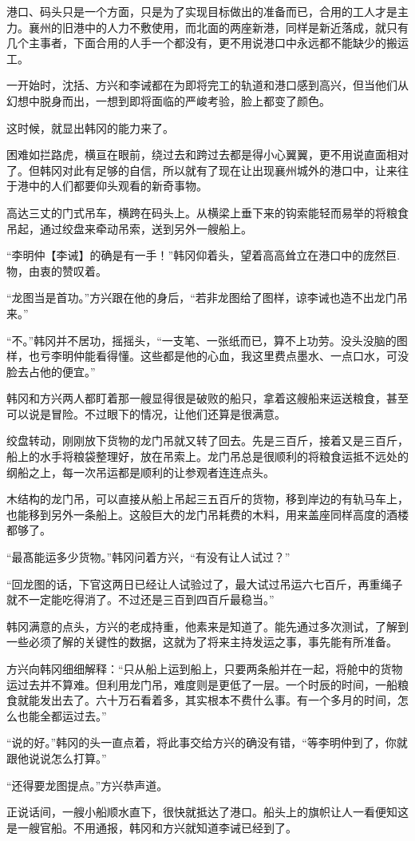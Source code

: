 港口、码头只是一个方面，只是为了实现目标做出的准备而已，合用的工人才是主力。襄州的旧港中的人力不敷使用，而北面的两座新港，同样是新近落成，就只有几个主事者，下面合用的人手一个都没有，更不用说港口中永远都不能缺少的搬运工。

一开始时，沈括、方兴和李诫都在为即将完工的轨道和港口感到高兴，但当他们从幻想中脱身而出，一想到即将面临的严峻考验，脸上都变了颜色。

这时候，就显出韩冈的能力来了。

困难如拦路虎，横亘在眼前，绕过去和跨过去都是得小心翼翼，更不用说直面相对了。但韩冈对此有足够的自信，所以就有了现在让出现襄州城外的港口中，让来往于港中的人们都要仰头观看的新奇事物。

高达三丈的门式吊车，横跨在码头上。从横梁上垂下来的钩索能轻而易举的将粮食吊起，通过绞盘来牵动吊索，送到另外一艘船上。

“李明仲【李诫】的确是有一手！”韩冈仰着头，望着高高耸立在港口中的庞然巨.物，由衷的赞叹着。

“龙图当是首功。”方兴跟在他的身后，“若非龙图给了图样，谅李诫也造不出龙门吊来。”

“不。”韩冈并不居功，摇摇头，“一支笔、一张纸而已，算不上功劳。没头没脑的图样，也亏李明仲能看得懂。这些都是他的心血，我这里费点墨水、一点口水，可没脸去占他的便宜。”

韩冈和方兴两人都盯着那一艘显得很是破败的船只，拿着这艘船来运送粮食，甚至可以说是冒险。不过眼下的情况，让他们还算是很满意。

绞盘转动，刚刚放下货物的龙门吊就又转了回去。先是三百斤，接着又是三百斤，船上的水手将粮袋整理好，放在吊索上。龙门吊总是很顺利的将粮食运抵不远处的纲船之上，每一次吊运都是顺利的让参观者连连点头。

木结构的龙门吊，可以直接从船上吊起三五百斤的货物，移到岸边的有轨马车上，也能移到另外一条船上。这般巨大的龙门吊耗费的木料，用来盖座同样高度的酒楼都够了。

“最髙能运多少货物。”韩冈问着方兴，“有没有让人试过？”

“回龙图的话，下官这两日已经让人试验过了，最大试过吊运六七百斤，再重绳子就不一定能吃得消了。不过还是三百到四百斤最稳当。”

韩冈满意的点头，方兴的老成持重，他素来是知道了。能先通过多次测试，了解到一些必须了解的关键性的数据，这就为了将来主持发运之事，事先能有所准备。

方兴向韩冈细细解释：“只从船上运到船上，只要两条船并在一起，将舱中的货物运过去并不算难。但利用龙门吊，难度则是更低了一层。一个时辰的时间，一船粮食就能发出去了。六十万石看着多，其实根本不费什么事。有一个多月的时间，怎么也能全都运过去。”

“说的好。”韩冈的头一直点着，将此事交给方兴的确没有错，“等李明仲到了，你就跟他说说怎么打算。”

“还得要龙图提点。”方兴恭声道。

正说话间，一艘小船顺水直下，很快就抵达了港口。船头上的旗帜让人一看便知这是一艘官船。不用通报，韩冈和方兴就知道李诫已经到了。

